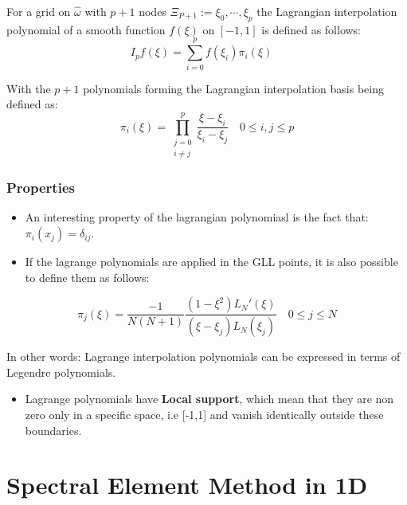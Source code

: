 \documentclass[
]{scrartcl}
\providecommand{\tightlist}{%
  \setlength{\itemsep}{0pt}\setlength{\parskip}{0pt}}
\begin{document}
For a grid on \(\hat{\omega}\) with \(p+1\) nodes
\(\Xi_{P+1}:= {\xi_0,\cdots,\xi_p}\) the Lagrangian interpolation
polynomial of a smooth function \(f(\xi)\) on \([-1,1]\) is defined as
follows: \begin{equation}
I_pf(\xi) = \sum_{i=0}^{p} f(\xi_{i})\pi_i(\xi)  \quad
\end{equation}

With the \(p+1\) polynomials forming the Lagrangian interpolation basis
being defined as: \begin{equation}
\pi_i(\xi)  = \prod_{\substack{j=0\\i \neq j}}^p \frac{\xi - \xi_i}{\xi_i - \xi_j}  \quad 0 \leq i,j \leq p
\end{equation}

\hypertarget{properties-1}{%
\subsubsection{Properties}\label{properties-1}}

\begin{itemize}
\item
  An interesting property of the lagrangian polynomiasl is the fact
  that: \(\pi_i(x_j)=\delta_{ij}\).
\item
  If the lagrange polynomials are applied in the GLL points, it is also
  possible to define them as follows:
\end{itemize}

\begin{equation}
    \pi_j(\xi) = \frac{-1}{N(N+1)} \frac{(1-{\xi}^2)L_N'(\xi)}{(\xi-\xi_j)L_N(\xi_j)}  \quad 0 \leq j \leq N 
\end{equation}

In other words: Lagrange interpolation polynomials can be expressed in
terms of Legendre polynomials.

\begin{itemize}
\tightlist
\item
  Lagrange polynomials have \textbf{Local support}, which mean that they
  are non zero only in a specific space, i.e {[}-1,1{]} and vanish
  identically outside these boundaries.
\end{itemize}

\hypertarget{spectral-element-method-in-1d}{%
\section{Spectral Element Method in
1D}\label{spectral-element-method-in-1d}}
\end{document}
